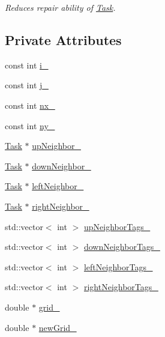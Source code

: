 \begin{DoxyCompactItemize}
\begin{DoxyCompactList}\small\item\em Reduces repair ability of \hyperlink{classTask}{Task}. \end{DoxyCompactList}\end{DoxyCompactItemize}
\subsection*{Private Attributes}
\begin{DoxyCompactItemize}
\item 
const int \hyperlink{classTask_aa454be94224aebece247cf0cd23fcffc}{i\+\_\+}
\item 
const int \hyperlink{classTask_aced73e768f619c3b56184befe3691aaf}{j\+\_\+}
\item 
const int \hyperlink{classTask_ad42667f57720ad0304e329e9d5b2b1f2}{nx\+\_\+}
\item 
const int \hyperlink{classTask_a786ae2a58cd74dda7142dc19649d87c5}{ny\+\_\+}
\item 
\hyperlink{classTask}{Task} $\ast$ \hyperlink{classTask_afb2ba19e810d01148e7a125e14ce755c}{up\+Neighbor\+\_\+}
\item 
\hyperlink{classTask}{Task} $\ast$ \hyperlink{classTask_a8554727d257017a90dbd0d52eaf6fe52}{down\+Neighbor\+\_\+}
\item 
\hyperlink{classTask}{Task} $\ast$ \hyperlink{classTask_a1a33c520e485401263ef144361e18dde}{left\+Neighbor\+\_\+}
\item 
\hyperlink{classTask}{Task} $\ast$ \hyperlink{classTask_aa6d859faf14ed3e950923562dba9d848}{right\+Neighbor\+\_\+}
\item 
std\+::vector$<$ int $>$ \hyperlink{classTask_ac143013d3e48eddf3aab992077c5d05a}{up\+Neighbor\+Tags\+\_\+}
\item 
std\+::vector$<$ int $>$ \hyperlink{classTask_a9c1d1cfcf9285f44029a58820ae082a4}{down\+Neighbor\+Tags\+\_\+}
\item 
std\+::vector$<$ int $>$ \hyperlink{classTask_a0968fecb0e49a48f4af6824fd513f752}{left\+Neighbor\+Tags\+\_\+}
\item 
std\+::vector$<$ int $>$ \hyperlink{classTask_a3a426a21f7ba4c4f91479207f96d6a66}{right\+Neighbor\+Tags\+\_\+}
\item 
double $\ast$ \hyperlink{classTask_ab7117d32273662d2695f80f5ea245331}{grid\+\_\+}
\item 
double $\ast$ \hyperlink{classTask_a554be6d55c1e3204cf946d9c0faf97c3}{new\+Grid\+\_\+}
\item 

\end{DoxyCompactItemize}
